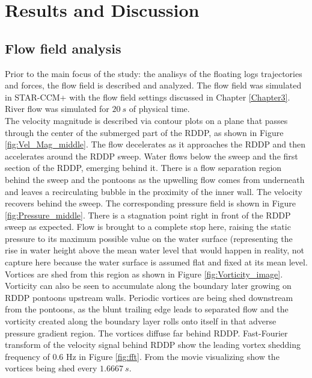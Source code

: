 
\chapter{Results and Discussion} %

\label{Chapter4} %
\FloatBarrier
\section{Flow field analysis}
Prior to the main focus of the study: the analisys of the floating logs trajectories and forces, the flow field is described and analyzed. The flow field was simulated in STAR-CCM+ with the flow field settings discussed in Chapter \ref{Chapter3}. River flow was simulated for $20~s$ of physical time.\\ 
The velocity magnitude is described via contour plots on a plane that passes through the center of the submerged part of the RDDP, as shown in Figure \ref{fig:Vel_Mag_middle}. The flow decelerates as it approaches the RDDP and then accelerates around the RDDP sweep. Water flows below the sweep and the first section of the RDDP, emerging behind it. There is a flow separation region behind the sweep and the pontoons as the upwelling flow comes from underneath and leaves a recirculating bubble in the proximity of the inner wall. The velocity recovers behind the sweep. The corresponding pressure field is shown in Figure \ref{fig:Pressure_middle}. There is a stagnation point right in front of the RDDP sweep as expected. Flow is brought to a complete stop here, raising the static pressure to its maximum possible value on the water surface (representing the rise in water height above the mean water level that would happen in reality, not capture here because the water surface is assumed flat and fixed at its mean level.\\ 
Vortices are shed from this region as shown in Figure \ref{fig:Vorticity_image}. Vorticity can also be seen to accumulate along the boundary later growing on RDDP pontoons upstream walls. %
Periodic vortices are being shed downstream from the pontoons, as the blunt trailing edge leads to separated flow and the vorticity created along the boundary layer rolls onto itself in that adverse pressure gradient region. The vortices diffuse far behind RDDP. Fast-Fourier transform of the velocity signal behind RDDP show the leading vortex shedding frequency of 0.6 Hz in Figure \ref{fig:fft}. From the movie visualizing show the vortices being shed every $1.6667~s$. 

